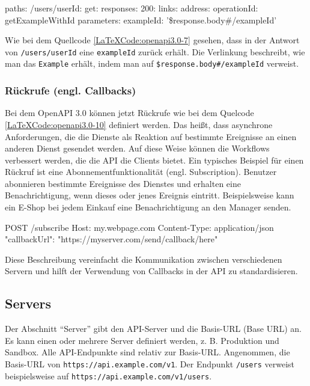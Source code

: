 \begin{LaTeXCode}[caption={Open API 3.0 - Verlinkungen},captionpos=b, label=LaTeXCode:openapi3.0-7][numbers=none]
paths: 
	/users/{userId}:
	 get:
	  responses:
	   200:
	    links:
	     address:
	      operationId: getExampleWithId
		  parameters:
		   exampleId: '\$response.body#/exampleId'
\end{LaTeXCode}

Wie bei dem Quellcode \ref{LaTeXCode:openapi3.0-7} gesehen, dass in der Antwort von \texttt{/users/{userId}} eine \texttt{exampleId} zurück erhält. Die Verlinkung beschreibt, wie man das \texttt{Example} erhält, indem man auf \texttt{\$response.body\#/exampleId} verweist.

\subsubsection{Rückrufe (engl. Callbacks)}

Bei dem OpenAPI 3.0 können jetzt Rückrufe wie bei dem Quelcode \ref{LaTeXCode:openapi3.0-10} definiert werden. Das heißt, dass asynchrone Anforderungen, die die Dienste als Reaktion auf bestimmte Ereignisse an einen anderen Dienst gesendet werden. Auf diese Weise können die Workflows verbessert werden, die die API die Clients bietet. Ein typisches Beispiel für einen Rückruf ist eine Abonnementfunktionalität (engl. Subscription). Benutzer abonnieren bestimmte Ereignisse des Dienstes und erhalten eine Benachrichtigung, wenn dieses oder jenes Ereignis eintritt. Beispielsweise kann ein E-Shop bei jedem Einkauf eine Benachrichtigung an den Manager senden\cite{openapicallbacks17}.

\begin{LaTeXCode}[caption={Open API 3.0 - Callbacks\cite{openapicallbacks17}},captionpos=b, label=LaTeXCode:openapi3.0-10][numbers=none]
POST /subscribe
Host: my.webpage.com
Content-Type: application/json
{
	"callbackUrl": "https://myserver.com/send/callback/here"
}
\end{LaTeXCode}

Diese Beschreibung vereinfacht die Kommunikation zwischen verschiedenen Servern und hilft der Verwendung von Callbacks in der API zu standardisieren.

\subsection{Servers}

Der Abschnitt "`Server"' gibt den API-Server und die Basis-URL (Base URL) an. Es kann einen oder mehrere Server definiert werden, z. B. Produktion und Sandbox\cite{openapiserver17}. Alle API-Endpunkte sind relativ zur Basis-URL. Angenommen, die Basis-URL von \texttt{https://api.example.com/v1}. Der Endpunkt \texttt{/users} verweist beispielsweise auf \texttt{https://api.example.com/v1/users}\cite{openapiapiserverundbaseurl17}.\\

